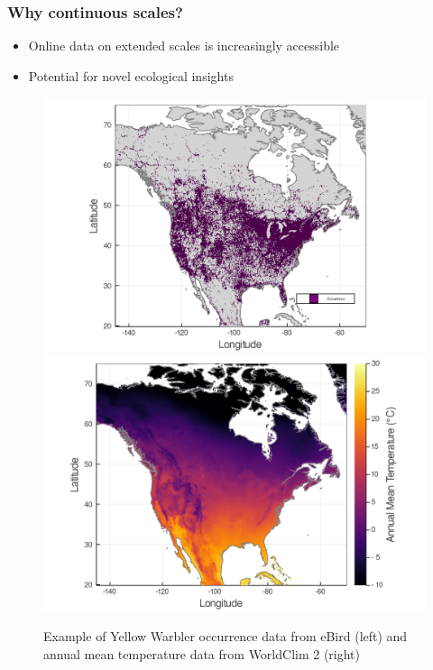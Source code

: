 \documentclass[10pt]{beamer}
\begin{document}
\begin{frame}
  \frametitle{Why continuous scales?}
  \begin{itemize}
    \item Online data on extended scales is increasingly accessible
    \item Potential for novel ecological insights
  \end{itemize}
  \begin{figure}
    \centering
    \hspace*{-1cm}\includegraphics[scale=0.10]{fig/01_raw_singlesp.png}%
    \includegraphics[scale=0.10]{fig/wc_temp.png}
    \caption{Example of Yellow Warbler occurrence data from eBird (left) and  annual mean temperature data from WorldClim 2 (right)}
  \end{figure}
\end{frame}
\end{document}
